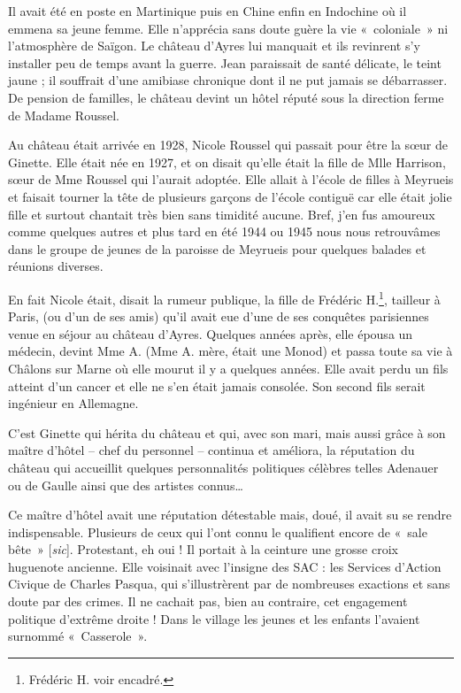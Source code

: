 Il avait été en poste en Martinique puis en Chine enfin en Indochine où il emmena sa jeune
femme. Elle n’apprécia sans doute guère la vie «~coloniale~» ni l’atmosphère de Saïgon. Le
château d’Ayres lui manquait et ils revinrent s’y installer peu de temps avant la guerre. Jean
paraissait de santé délicate, le teint jaune ; il souffrait d’une amibiase chronique dont il ne put
jamais se débarrasser. De pension de familles, le château devint un hôtel réputé sous la
direction ferme de Madame Roussel.

Au château était arrivée en 1928, Nicole Roussel qui passait pour être la sœur de Ginette. Elle
était née en 1927, et on disait qu’elle était la fille de Mlle Harrison, sœur de Mme Roussel
qui l’aurait adoptée. Elle allait à l’école de filles à Meyrueis et faisait tourner la tête de
plusieurs garçons de l’école contiguë car elle était jolie fille et surtout chantait très bien sans
timidité aucune. Bref, j’en fus amoureux comme quelques autres et plus tard en été 1944 ou
1945 nous nous retrouvâmes dans le groupe de jeunes de la paroisse de Meyrueis pour
quelques balades et réunions diverses.

En fait Nicole était, disait la rumeur publique, la fille de Frédéric H.\footnote{Frédéric H. voir encadré.}, tailleur à Paris, (ou d’un de ses amis) qu’il avait eue d’une de ses conquêtes parisiennes venue en séjour au château d’Ayres. Quelques années après, elle épousa un médecin, devint Mme A. (Mme A. mère, était
une Monod) et passa toute sa vie à Châlons sur Marne où elle mourut il y a quelques années.
Elle avait perdu un fils atteint d’un cancer et elle ne s’en était jamais consolée. Son second fils
serait ingénieur en Allemagne.

C’est Ginette qui hérita du château et qui, avec son mari, mais aussi grâce à son maître d’hôtel
-- chef du personnel -- continua et améliora, la réputation du château qui accueillit quelques
personnalités politiques célèbres telles Adenauer ou de Gaulle ainsi que des artistes connus…

Ce maître d’hôtel avait une réputation détestable mais, doué, il avait su se rendre
indispensable. Plusieurs de ceux qui l’ont connu le qualifient encore de «~sale bête~» [\textit{sic}].
Protestant, eh oui ! Il portait à la ceinture une grosse croix huguenote ancienne. Elle voisinait
avec l’insigne des SAC : les Services d’Action Civique de Charles Pasqua, qui s’illustrèrent
par de nombreuses exactions et sans doute par des crimes. Il ne cachait pas, bien au contraire,
cet engagement politique d’extrême droite ! Dans le village les jeunes et les enfants
l’avaient surnommé «~Casserole~».

